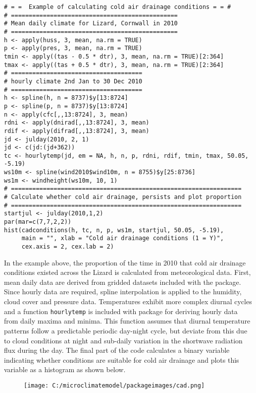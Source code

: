 \documentclass[]{article}
\begin{document}
\begin{verbatim}
# = =  Example of calculating cold air drainage conditions = = #
# ===============================================
# Mean daily climate for Lizard, Cornwall in 2010
# ===============================================
h <- apply(huss, 3, mean, na.rm = TRUE)
p <- apply(pres, 3, mean, na.rm = TRUE)
tmin <- apply((tas - 0.5 * dtr), 3, mean, na.rm = TRUE)[2:364]
tmax <- apply((tas + 0.5 * dtr), 3, mean, na.rm = TRUE)[2:364]
# =====================================
# hourly climate 2nd Jan to 30 Dec 2010
# =====================================
h <- spline(h, n = 8737)$y[13:8724]
p <- spline(p, n = 8737)$y[13:8724]
n <- apply(cfc[,,13:8724], 3, mean)
rdni <- apply(dnirad[,,13:8724], 3, mean)
rdif <- apply(difrad[,,13:8724], 3, mean)
jd <- julday(2010, 2, 1)
jd <- c(jd:(jd+362))
tc <- hourlytemp(jd, em = NA, h, n, p, rdni, rdif, tmin, tmax, 50.05, -5.19)
ws10m <- spline(wind2010$wind10m, n = 8755)$y[25:8736]
ws1m <- windheight(ws10m, 10, 1)
# =================================================================
# Calculate whether cold air drainage, persists and plot proportion
# =================================================================
startjul <- julday(2010,1,2)
par(mar=c(7,7,2,2))
hist(cadconditions(h, tc, n, p, ws1m, startjul, 50.05, -5.19),
     main = "", xlab = "Cold air drainage conditions (1 = Y)",
     cex.axis = 2, cex.lab = 2)
\end{verbatim}

In the example above, the proportion of the time in 2010 that cold air
drainage conditions existed across the Lizard is calculated from
meteorological data. First, mean daily data are derived from gridded
datasets included with the package. Since hourly data are required,
spline interpolation is applied to the humidity, cloud cover and
pressure data. Temperatures exhibit more complex diurnal cycles and a
function \texttt{hourlytemp} is included with package for deriving
hourly data from daily maxima and minima. This function assumes that
diurnal temperature patterns follow a predictable periodic day-night
cycle, but deviate from this due to cloud conditions at night and
sub-daily variation in the shortwave radiation flux during the day. The
final part of the code calculates a binary variable indicating whether
conditions are suitable for cold air drainage and plots this variable as
a histogram as shown below.

\begin{figure}
\centering
\texttt{[image: C:/microclimatemodel/packageimages/cad.png]}
\caption{}
\end{figure}
\end{document}
